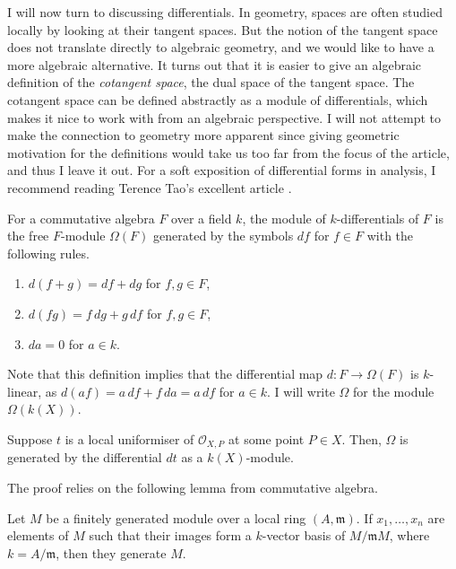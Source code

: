 I will now turn to discussing differentials. In geometry, spaces are often
studied locally by looking at their tangent spaces. But the notion of
the tangent space does not translate directly to algebraic geometry,
and we would like to have a more algebraic alternative. It turns out that it
is easier to give an algebraic definition of the \emph{cotangent space},
the dual space of the tangent space. The cotangent space can be defined
abstractly as a module of differentials, which makes it nice to work with from
an algebraic perspective. I will not attempt to make the connection to
geometry more apparent since giving geometric motivation for the definitions
would take us too far from the focus of the article, and thus I leave it out.
For a soft exposition of differential forms in analysis, I recommend reading
Terence Tao's excellent article \cite{tao}.
\begin{defin}
  For a commutative algebra $F$ over a field $k$, the module of
  $k$-differentials of $F$ is the free $F$-module $\Omega(F)$ generated
  by the symbols $df$ for $f\in F$ with the following rules.
  \begin{enumerate}
    \item $d(f+g)=df+dg$ for $f, g\in F$,
    \item $d(fg)=f\,dg+g\,df$ for $f, g\in F$,
    \item $da = 0$ for $a\in k$.
  \end{enumerate}
\end{defin}
Note that this definition implies that the differential map $d:F\to\Omega(F)$
is $k$-linear, as $d(af)=a\,df+f\,da=a\,df$ for $a\in k$. I will write
$\Omega$ for the module $\Omega\left(k(X)\right)$.
\begin{prop}
  Suppose $t$ is a local uniformiser of $\mathscr{O}_{X,P}$ at some
  point $P\in X$. Then, $\Omega$ is generated by the differential $dt$
  as a $k(X)$-module.
\end{prop}
The proof relies on the following lemma from commutative algebra.
\begin{lemm}
  Let $M$ be a finitely generated module over a local ring $(A,\mathfrak{m})$.
  If $x_{1},\ldots,x_{n}$ are elements of $M$ such that their images form
  a $k$-vector basis of $M/\mathfrak{m}M$, where $k=A/\mathfrak{m}$,
  then they generate $M$.
\end{lemm}
